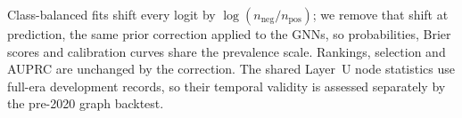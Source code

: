 Class-balanced fits shift every logit by \(\log(n_{\mathrm{neg}}/n_{\mathrm{pos}})\); we remove that shift at prediction, the same prior correction applied to the GNNs, so probabilities, Brier scores and calibration curves share the prevalence scale. Rankings, selection and AUPRC are unchanged by the correction. The shared Layer~U node statistics use full-era development records, so their temporal validity is assessed separately by the pre-2020 graph backtest.
